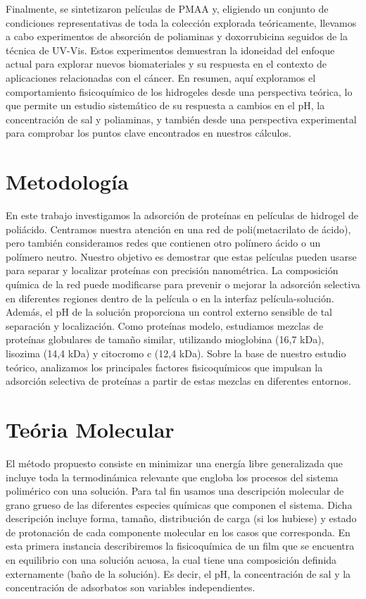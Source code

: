 Finalmente, se sintetizaron pel\'iculas de PMAA y, eligiendo un conjunto de condiciones representativas de toda la colecci\'on explorada te\'oricamente, llevamos a cabo experimentos de absorci\'on de poliaminas y doxorrubicina seguidos de la t\'ecnica de UV-Vis.
Estos experimentos demuestran la idoneidad del enfoque actual para explorar nuevos biomateriales y su respuesta en el contexto de aplicaciones relacionadas con el c\'ancer.
En resumen, aqu\'i exploramos el comportamiento fisicoqu\'imico de los hidrogeles desde una perspectiva te\'orica, lo que permite un estudio sistem\'atico de su respuesta a cambios en el pH, la concentraci\'on de sal y poliaminas, y tambi\'en desde una perspectiva experimental para comprobar los puntos clave encontrados en nuestros c\'alculos.


\section{Metodolog\'ia}

En este trabajo investigamos la adsorción de proteínas en películas de hidrogel de poliácido. Centramos nuestra atención en una red de poli(metacrilato de ácido), pero también consideramos redes que contienen otro polímero ácido o un polímero neutro. Nuestro objetivo es demostrar que estas películas pueden usarse para separar y localizar proteínas con precisión nanométrica. La composición química de la red puede modificarse para prevenir o mejorar la adsorción selectiva en diferentes regiones dentro de la película o en la interfaz película-solución. Además, el pH de la solución proporciona un control externo sensible de tal separación y localización. Como proteínas modelo, estudiamos mezclas de proteínas globulares de tamaño similar, utilizando mioglobina (16,7 kDa), lisozima (14,4 kDa) y citocromo c (12,4 kDa). Sobre la base de nuestro estudio teórico, analizamos los principales factores fisicoquímicos que impulsan la adsorción selectiva de proteínas a partir de estas mezclas en diferentes entornos.







\section{Te\'oria Molecular } \label{sec:film-teoria}

El m\'etodo propuesto consiste en minimizar una energ\'ia libre generalizada que incluye toda la termodin\'amica relevante que engloba los procesos del sistema polim\'erico con una soluci\'on.
Para tal fin  usamos  una descripci\'on molecular de grano grueso de las diferentes especies qu\'imicas que componen el sistema.
Dicha descripci\'on incluye forma, tama\~no, distribuci\'on de carga (si los hubiese) y estado de protonaci\'on de cada componente molecular en los casos que corresponda.
En esta primera instancia describiremos la fisicoqu\'imica de un film  que  se encuentra en  equilibrio con una soluci\'on acuosa, la cual  tiene una composici\'on  definida externamente (ba\~no de la soluci\'on).
Es decir, el pH, la concentración de sal y la concentraci\'on de adsorbatos son variables independientes.


